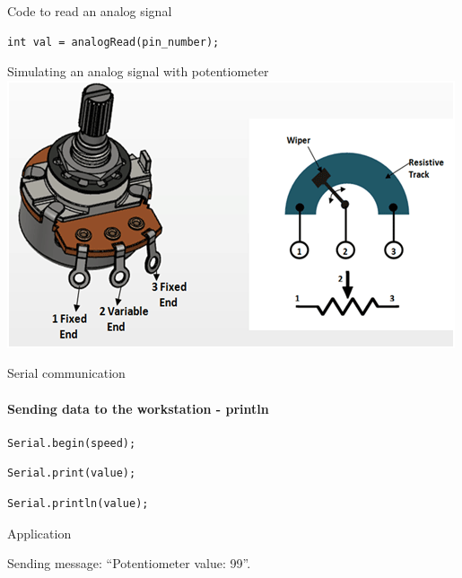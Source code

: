 \documentclass[aspectratio=1610]{beamer}
\begin{document}

\begin{frame}{Code to read an analog signal}

\bigskip
\begin{semiverbatim}
\begin{lstlisting}
int val = analogRead(pin_number);
\end{lstlisting}
\end{semiverbatim}

\end{frame}



\begin{frame}[t,plain]{Simulating an analog signal with potentiometer}
\includegraphics[width=.3\textwidth]{figs/3-potentiometer-pinout.png}
\end{frame}



\begin{frame}{Serial communication}
\framesubtitle{Sending data to the workstation - println}

\bigskip
\begin{semiverbatim}
\begin{lstlisting}
Serial.begin(speed);
\end{lstlisting}
\end{semiverbatim}

\vfill

\begin{semiverbatim}
\begin{lstlisting}
Serial.print(value);
\end{lstlisting}
\end{semiverbatim}

\vfill

\begin{semiverbatim}
\begin{lstlisting}
Serial.println(value);
\end{lstlisting}
\end{semiverbatim}
\end{frame}



\begin{frame}{Application}

\smallskip
Sending message: ``Potentiometer value: 99''.
\end{frame}
\end{document}
